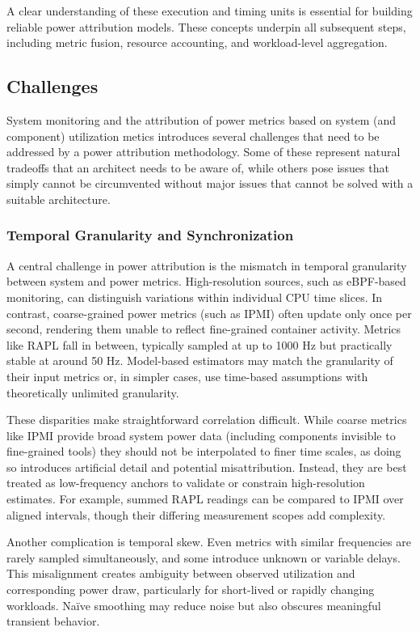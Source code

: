 A clear understanding of these execution and timing units is essential for building reliable power attribution models. These concepts underpin all subsequent steps, including metric fusion, resource accounting, and workload-level aggregation.

\subsection{Challenges}
\label{ch:limitations}

System monitoring and the attribution of power metrics based on system (and component) utilization metics introduces several challenges that need to be addressed by a power attribution methodology. Some of these represent natural tradeoffs that an architect needs to be aware of, while others pose issues that simply cannot be circumvented without major issues that cannot be solved with a suitable architecture.

\subsubsection{Temporal Granularity and Synchronization}

A central challenge in power attribution is the mismatch in temporal granularity between system and power metrics. High-resolution sources, such as eBPF-based monitoring, can distinguish variations within individual CPU time slices. In contrast, coarse-grained power metrics (such as IPMI) often update only once per second, rendering them unable to reflect fine-grained container activity. Metrics like RAPL fall in between, typically sampled at up to 1000 Hz but practically stable at around 50 Hz. Model-based estimators may match the granularity of their input metrics or, in simpler cases, use time-based assumptions with theoretically unlimited granularity.

These disparities make straightforward correlation difficult. While coarse metrics like IPMI provide broad system power data (including components invisible to fine-grained tools) they should not be interpolated to finer time scales, as doing so introduces artificial detail and potential misattribution. Instead, they are best treated as low-frequency anchors to validate or constrain high-resolution estimates. For example, summed RAPL readings can be compared to IPMI over aligned intervals, though their differing measurement scopes add complexity.

Another complication is temporal skew. Even metrics with similar frequencies are rarely sampled simultaneously, and some introduce unknown or variable delays. This misalignment creates ambiguity between observed utilization and corresponding power draw, particularly for short-lived or rapidly changing workloads. Naïve smoothing may reduce noise but also obscures meaningful transient behavior.

